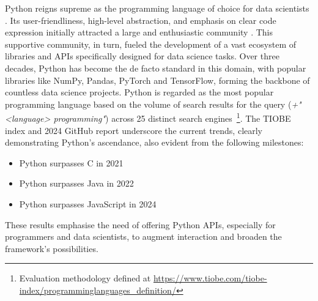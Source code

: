 Python reigns supreme as the programming language of choice for data scientists \cite{Python_CS-R9526}. Its user-friendliness, high-level abstraction, and emphasis on clear code expression initially attracted a large and enthusiastic community \cite{StackOverflowDeveloper}. This supportive community, in turn, fueled the development of a vast ecosystem of libraries and \glspl{API} specifically designed for data science tasks. Over three decades, Python has become the de facto standard in this domain, with popular libraries like NumPy, Pandas, PyTorch and TensorFlow, forming the backbone of countless data science projects. Python is regarded as the most popular programming language based on the volume of search results for the query (\textit{+"<language> programming"}) across 25 distinct search engines~\footnote{Evaluation methodology defined at \url{https://www.tiobe.com/tiobe-index/programminglanguages_definition/}}. The TIOBE index \cite{TIOBEIndex} and 2024 GitHub report \cite{PythonTopLanguage} underscore the current trends, clearly demonstrating Python's ascendance, also evident from the following milestones:
\begin{itemize}
    \item Python surpasses C in 2021
    \item Python surpasses Java in 2022
    \item Python surpasses JavaScript in 2024
\end{itemize}
These results emphasise the need of offering Python \glspl{API}, especially for programmers and data scientists, to augment interaction and broaden the framework's possibilities.